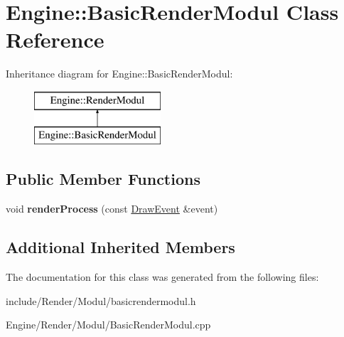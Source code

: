 \hypertarget{classEngine_1_1BasicRenderModul}{}\section{Engine\+:\+:Basic\+Render\+Modul Class Reference}
\label{classEngine_1_1BasicRenderModul}
Inheritance diagram for Engine\+:\+:Basic\+Render\+Modul\+:\begin{figure}[H]
\begin{center}
\leavevmode
\includegraphics[height=2.000000cm]{classEngine_1_1BasicRenderModul}
\end{center}
\end{figure}
\subsection*{Public Member Functions}
\begin{DoxyCompactItemize}
\item 
\hypertarget{classEngine_1_1BasicRenderModul_a49ebb39a43cd4eb14061a1af93506f2f}{}void {\bfseries render\+Process} (const \hyperlink{classEngine_1_1DrawEvent}{Draw\+Event} \&event)\label{classEngine_1_1BasicRenderModul_a49ebb39a43cd4eb14061a1af93506f2f}

\end{DoxyCompactItemize}
\subsection*{Additional Inherited Members}


The documentation for this class was generated from the following files\+:\begin{DoxyCompactItemize}
\item 
include/\+Render/\+Modul/basicrendermodul.\+h\item 
Engine/\+Render/\+Modul/Basic\+Render\+Modul.\+cpp\end{DoxyCompactItemize}
